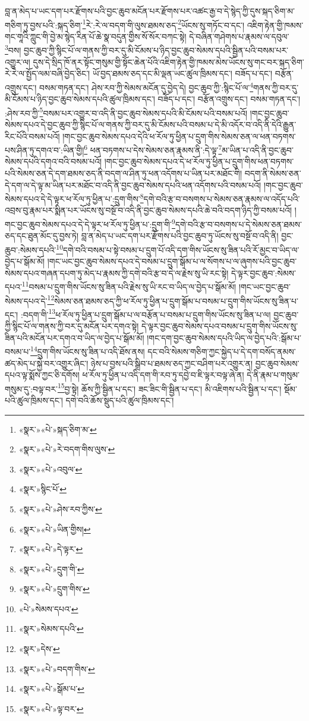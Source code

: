 བླ་ན་མེད་པ་ཡང་དག་པར་རྫོགས་པའི་བྱང་ཆུབ་མངོན་པར་རྫོགས་པར་འཚང་རྒྱ་བ་དེ་སྙེད་ཀྱི་དུས་སྐད་ཅིག་མ་གཅིག་ཏུ་བྱས་པའི་:སྐད་ཅིག་\footnote{«སྣར་»«པེ་»སྐད་ཅིག་མ་}རེ་:རེ་ལ་བདག་གི་ལུས་ཐམས་ཅད་\footnote{«སྣར་»«པེ་»རེ་བདག་གིས་ལུས་}ཡོངས་སུ་གཏོང་བ་དང་། འཇིག་རྟེན་གྱི་ཁམས་གང་གཱའི་ཀླུང་གི་བྱེ་མ་སྙེད་རིན་པོ་ཆེ་སྣ་བདུན་གྱིས་སོ་སོར་བཀང་སྟེ། དེ་བཞིན་གཤེགས་པ་རྣམས་ལ་དབུལ་\footnote{«སྣར་»«པེ་»འབུལ་}བས། བྱང་ཆུབ་ཀྱི་སྙིང་པོ་ལ་གནས་ཀྱི་བར་དུ་མི་ངོམས་པ་ཉིད་བྱང་ཆུབ་སེམས་དཔའི་སྦྱིན་པའི་བསམ་པར་འགྱུར་ལ། དུས་དེ་སྲིད་ཁོ་ནར་སྟོང་གསུམ་གྱི་སྟོང་ཆེན་པོའི་འཇིག་རྟེན་གྱི་ཁམས་མེས་ཡོངས་སུ་གང་བར་སྐད་ཅིག་རེ་རེ་ལ་སྤྱོད་ལམ་བཞི་བྱེད་ཅིང་། ཡོ་བྱད་ཐམས་ཅད་དང་མི་ལྡན་ཡང་ཚུལ་ཁྲིམས་དང་། བཟོད་པ་དང་། བརྩོན་འགྲུས་དང་། བསམ་གཏན་དང་། ཤེས་རབ་ཀྱི་སེམས་མངོན་དུ་བྱེད་དེ། བྱང་ཆུབ་ཀྱི་:སྙིང་པོ་ལ་\footnote{«སྣར་»སྙིང་པོ་}གནས་ཀྱི་བར་དུ་མི་ངོམས་པ་ཉིད་བྱང་ཆུབ་སེམས་དཔའི་ཚུལ་ཁྲིམས་དང་། བཟོད་པ་དང་། བརྩོན་འགྲུས་དང་། བསམ་གཏན་དང་། :ཤེས་རབ་ཀྱི་\footnote{«སྣར་»«པེ་»ཤེས་རབ་ཀྱིས་}བསམ་པར་འགྱུར་བ་འདི་ནི་བྱང་ཆུབ་སེམས་དཔའི་མི་ངོམས་པའི་བསམ་པའོ། །གང་བྱང་ཆུབ་སེམས་དཔའ་དེ་བྱང་ཆུབ་ཀྱི་སྙིང་པོ་ལ་གནས་ཀྱི་བར་དུ་མི་ངོམས་པའི་བསམ་པ་དེ་མི་འདོར་བ་འདི་ནི་དེའི་རྒྱུན་རིང་པོའི་བསམ་པའོ། །གང་བྱང་ཆུབ་སེམས་དཔའ་དེའི་ཕ་རོལ་ཏུ་ཕྱིན་པ་དྲུག་གིས་སེམས་ཅན་ལ་ཕན་བཏགས་པས་ཤིན་ཏུ་དགའ་བ་:ཡིན་གྱི།\footnote{«སྣར་»«པེ་»ཡིན་གྱིས།} ཕན་བཏགས་པ་དེས་སེམས་ཅན་རྣམས་ནི་:དེ་ལྟ་\footnote{«སྣར་»«པེ་»དེ་ལྟར་}མ་ཡིན་པ་འདི་ནི་བྱང་ཆུབ་སེམས་དཔའི་དགའ་བའི་བསམ་པའོ། །གང་བྱང་ཆུབ་སེམས་དཔའ་དེ་ཕ་རོལ་ཏུ་ཕྱིན་པ་དྲུག་གིས་ཕན་བཏགས་པའི་སེམས་ཅན་དེ་དག་ཐམས་ཅད་ནི་བདག་ལ་ཤིན་ཏུ་ཕན་འདོགས་པ་ཡིན་པར་མཐོང་གི། བདག་ནི་སེམས་ཅན་དེ་དག་ལ་དེ་ལྟ་མ་ཡིན་པར་མཐོང་བ་འདི་ནི་བྱང་ཆུབ་སེམས་དཔའི་ཕན་འདོགས་པའི་བསམ་པའོ། །གང་བྱང་ཆུབ་སེམས་དཔའ་དེ་དེ་ལྟར་ཕ་རོལ་ཏུ་ཕྱིན་པ་:དྲུག་གིས་\footnote{«སྣར་»«པེ་»དྲུག་གི་}དགེ་བའི་རྩ་བ་བསགས་པ་སེམས་ཅན་རྣམས་ལ་འདོད་པའི་འབྲས་བུ་རྣམ་པར་སྨིན་པར་ཡོངས་སུ་བསྔོ་བ་འདི་ནི་བྱང་ཆུབ་སེམས་དཔའི་ཆེ་བའི་བདག་ཉིད་ཀྱི་བསམ་པའོ། །གང་བྱང་ཆུབ་སེམས་དཔའ་དེ་དེ་ལྟར་ཕ་རོལ་ཏུ་ཕྱིན་པ་:དྲུག་གི་\footnote{«སྣར་»«པེ་»དྲུག་གིས་}དགེ་བའི་རྩ་བ་བསགས་པ་དེ་སེམས་ཅན་ཐམས་ཅད་དང་ཐུན་མོང་དུ་བྱས་ཏེ། བླ་ན་མེད་པ་ཡང་དག་པར་རྫོགས་པའི་བྱང་ཆུབ་ཏུ་ཡོངས་སུ་བསྔོ་བ་འདི་ནི། བྱང་ཆུབ་:སེམས་དཔའི་\footnote{«པེ་»སེམས་དཔའ་}དགེ་བའི་བསམ་པ་སྟེ་བསམ་པ་དྲུག་པོ་འདི་དག་གིས་ཡོངས་སུ་ཟིན་པའི་རོ་མྱང་བ་ཡིད་ལ་བྱེད་པ་སྒོམ་མོ། །གང་ཡང་བྱང་ཆུབ་སེམས་དཔའ་དེ་བསམ་པ་དྲུག་སྒོམ་པ་ལ་སོགས་པ་ལ་ཞུགས་པའི་བྱང་ཆུབ་སེམས་དཔའ་གཞན་དཔག་ཏུ་མེད་པ་རྣམས་ཀྱི་དགེ་བའི་རྩ་བ་དེ་ལ་རྗེས་སུ་ཡི་རང་སྟེ། དེ་ལྟར་བྱང་ཆུབ་:སེམས་དཔའ་\footnote{«སྣར་»སེམས་དཔའི་}བསམ་པ་དྲུག་གིས་ཡོངས་སུ་ཟིན་པའི་རྗེས་སུ་ཡི་རང་བ་ཡིད་ལ་བྱེད་པ་སྒོམ་མོ། །གང་ཡང་བྱང་ཆུབ་སེམས་དཔའ་དེ་\footnote{«སྣར་»དེས་}སེམས་ཅན་ཐམས་ཅད་ཀྱི་ཕ་རོལ་ཏུ་ཕྱིན་པ་དྲུག་སྒོམ་པ་བསམ་པ་དྲུག་གིས་ཡོངས་སུ་ཟིན་པ་དང་། :བདག་གི་\footnote{«སྣར་»«པེ་»བདག་གིས་}ཕ་རོལ་ཏུ་ཕྱིན་པ་དྲུག་སྒོམ་པ་ལ་བརྩོན་པ་བསམ་པ་དྲུག་གིས་ཡོངས་སུ་ཟིན་པ་ལ། བྱང་ཆུབ་ཀྱི་སྙིང་པོ་ལ་གནས་ཀྱི་བར་དུ་མངོན་པར་དགའ་སྟེ། དེ་ལྟར་བྱང་ཆུབ་སེམས་དཔའ་བསམ་པ་དྲུག་གིས་ཡོངས་སུ་ཟིན་པའི་མངོན་པར་དགའ་བ་ཡིད་ལ་བྱེད་པ་སྒོམ་མོ། །གང་དག་བྱང་ཆུབ་སེམས་དཔའི་ཡིད་ལ་བྱེད་པའི་:སྒོམ་པ་བསམ་པ་\footnote{«སྣར་»«པེ་»སྒོམ་པ་}དྲུག་གིས་ཡོངས་སུ་ཟིན་པ་འདི་ཐོས་ནས། དང་བའི་སེམས་གཅིག་ཀྱང་སྐྱེད་པ་དེ་དག་བསོད་ནམས་ཚད་མེད་པ་སྐྱེ་བར་འགྱུར་ཞིང་། ཉེས་པ་བྱས་པའི་སྒྲིབ་པ་ཐམས་ཅད་ཀྱང་བཤིག་པར་འགྱུར་ན། བྱང་ཆུབ་སེམས་དཔའ་ལྟ་སྨོས་ཀྱང་ཅི་དགོས། ཕ་རོལ་ཏུ་ཕྱིན་པ་འདི་དག་གི་རབ་ཏུ་དབྱེ་བ་ཇི་ལྟར་བལྟ་ཞེ་ན། དེ་ནི་རྣམ་པ་གསུམ་གསུམ་དུ་:བལྟ་བར་\footnote{«སྣར་»«པེ་»ལྟ་བར་}བྱ་སྟེ། ཆོས་ཀྱི་སྦྱིན་པ་དང་། ཟང་ཟིང་གི་སྦྱིན་པ་དང་། མི་འཇིགས་པའི་སྦྱིན་པ་དང་། སྡོམ་པའི་ཚུལ་ཁྲིམས་དང་། དགེ་བའི་ཆོས་སྡུད་པའི་ཚུལ་ཁྲིམས་དང་། 